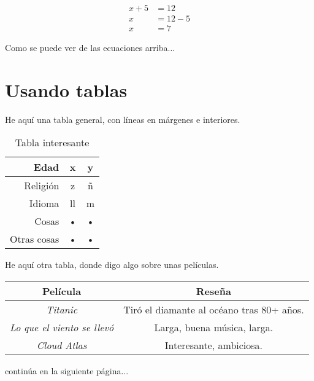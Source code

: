 \documentclass[11pt]{article} %
\begin{document}
\begin{align*}
x + 5 &= 12 \\      %
x &= 12 - 5 \\      %
x &= 7              %
\end{align*}        %

Como se puede ver de las ecuaciones arriba...

\section*{Usando tablas}

He aquí una tabla general, con líneas en márgenes e interiores.

\begin{table}[h!]
\centering
\caption{Tabla interesante}
\label{}
\begin{tabular}{|r|c|c|}
\hline 
Edad & x & y \\ 
\hline 
Religión & z & \~{n} \\ 
\hline 
Idioma & ll & m \\ 
\hline 
Cosas & • & • \\ 
\hline 
Otras cosas & • & • \\ 
\hline 
\end{tabular} 
\end{table}

He aquí otra tabla, donde digo algo sobre unas películas.
\begin{table}[h!]
\centering %
\begin{tabular}{cc}
Película & Reseña\\
\hline %
\emph{Titanic} & Tiró el diamante al océano tras 80+ años.\\
\emph{Lo que el viento se llevó} & Larga, buena música, larga.\\
\emph{Cloud Atlas} & Interesante, ambiciosa. \\
\hline
\end{tabular}
\end{table}
continúa en la siguiente página...
\newpage %
\end{document}
